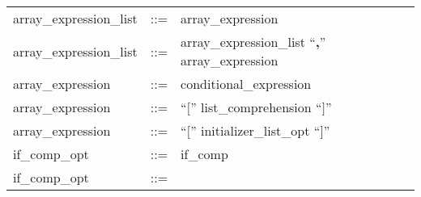 \begin{longtable}{lrl}
array\_expression\_list                    & ::= &
  \begin{minipage}[t]{\rulerhs}
    \raggedright
    array\_expression
  \end{minipage}                                                             \\
array\_expression\_list                    & ::= &
  \begin{minipage}[t]{\rulerhs}
    \raggedright
    array\_expression\_list ``{\bf ,}'' array\_expression
  \end{minipage}                                                             \\
array\_expression                          & ::= &
  \begin{minipage}[t]{\rulerhs}
    \raggedright
    conditional\_expression
  \end{minipage}                                                             \\
array\_expression                          & ::= &
  \begin{minipage}[t]{\rulerhs}
    \raggedright
    ``{\bf $[$}'' list\_comprehension ``{\bf $]$}''
  \end{minipage}                                                             \\
array\_expression                          & ::= &
  \begin{minipage}[t]{\rulerhs}
    \raggedright
    ``{\bf $[$}'' initializer\_list\_opt ``{\bf $]$}''
  \end{minipage}                                                             \\
if\_comp\_opt                              & ::= &
  \begin{minipage}[t]{\rulerhs}
    \raggedright
    if\_comp
  \end{minipage}                                                             \\
if\_comp\_opt                              & ::= &
  \begin{minipage}[t]{\rulerhs}
    \raggedright
    

\end{minipage}
\end{longtable}
